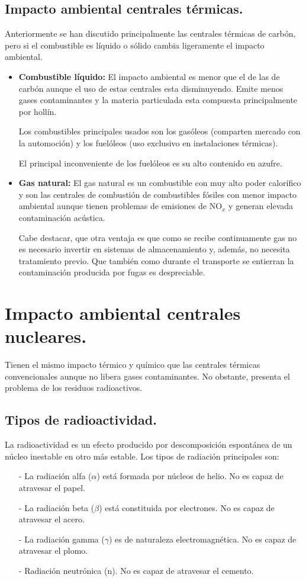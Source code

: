 \subsection{Impacto ambiental centrales térmicas.}
Anteriormente se han discutido principalmente las centrales térmicas de carbón, pero si el combustible es líquido o sólido cambia ligeramente el impacto ambiental.
\begin{itemize}
	\item \textbf{Combustible líquido:}
		El impacto ambiental es menor que el de las de carbón aunque el uso de estas centrales esta disminuyendo. Emite menos gases contaminantes y la materia particulada esta compuesta principalmente por hollín. 
		
		
		Los combustibles principales usados son los gasóleos (comparten mercado con la automoción) y los fuelóleos (uso exclusivo en instalaciones térmicas).
		
		El principal inconveniente de los fuelóleos es su alto contenido en azufre.
	\item \textbf{Gas natural:}
		El gas natural es un combustible con muy alto poder calorífico y son las centrales de combustión de combustibles fósiles con menor impacto ambiental aunque tienen problemas de emisiones de NO$_x$ y generan elevada contaminación acústica.
		
		Cabe destacar, que otra ventaja es que como se recibe continuamente gas no es necesario invertir en sistemas de almacenamiento y, además, no necesita tratamiento previo. Que también como durante el transporte se entierran la contaminación producida por fugas es despreciable.
\end{itemize}
\section{Impacto ambiental centrales nucleares.}
Tienen el mismo impacto térmico y químico que las centrales térmicas convencionales aunque no libera gases contaminantes. No obstante, presenta el problema de los residuos radioactivos.
\subsection{Tipos de radioactividad.}
La radioactividad es un efecto producido por descomposición espontánea de un núcleo inestable en otro más estable. Los tipos de radiación principales son:
\begin{itemize}
	\item [-] La radiación alfa ($\alpha$) está formada por núcleos de helio. No es capaz de atravesar el papel.
	\item [-] La radiación beta ($\beta$) está constituida por electrones. No es capaz de atravesar el acero.
	\item [-] La radiación gamma ($\gamma$) es de naturaleza electromagnética. No es capaz de atravesar el plomo.
	\item [-] Radiación neutrónica (n). No es capaz de atravesar el cemento.
\end{itemize}
